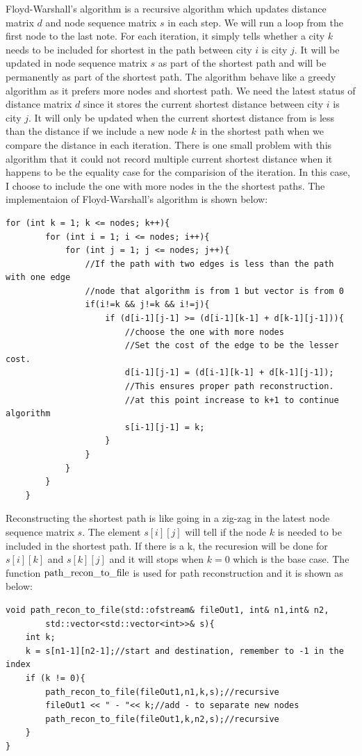 \documentclass[a4paper,12pt]{article}%
\begin{document}
Floyd-Warshall's algorithm is a recursive algorithm which updates distance matrix $d$ and 
node sequence matrix $s$ in each step. We will run a loop from the first node to the last note. For each iteration, it simply tells whether a city $k$ needs to be included for shortest in the path between city $i$ is city $j$. It will be updated in node sequence matrix $s$ as part of the shortest path and will be permanently as part of the shortest path. The algorithm behave like a greedy algorithm as it prefers more nodes and shortest path. We need the latest status of distance matrix $d$ since it stores the current shortest distance between city $i$ is city $j$. It will only be updated when the current shortest distance from is less than the distance if we include a new node $k$ in the shortest path when we compare the distance in each iteration. There is one small problem with this algorithm that it could not record multiple current shortest distance when it happens to be the equality case for the comparision of the iteration. In this case, I choose to include the one with more nodes in the the shortest paths. The implementaion of Floyd-Warshall’s algorithm is shown below:
\begin{lstlisting}[title = $\lstinline{WFI}$]
	for (int k = 1; k <= nodes; k++){
        for (int i = 1; i <= nodes; i++){
            for (int j = 1; j <= nodes; j++){
                //If the path with two edges is less than the path with one edge
                //node that algorithm is from 1 but vector is from 0
                if(i!=k && j!=k && i!=j){ 
                    if (d[i-1][j-1] >= (d[i-1][k-1] + d[k-1][j-1])){
                        //choose the one with more nodes
                        //Set the cost of the edge to be the lesser cost.
                        d[i-1][j-1] = (d[i-1][k-1] + d[k-1][j-1]);
                        //This ensures proper path reconstruction. 
                        //at this point increase to k+1 to continue algorithm
                        s[i-1][j-1] = k;
                    }
                }
            }  	  
		}
    }        
\end{lstlisting}
Reconstructing the shortest path is like going in a zig-zag in the latest node sequence matrix $s$. The element $s[i][j]$ will tell if the node $k$ is needed to be included in the shortest path. If there is a k, the recuresion will be done for $s[i][k]$ and $s[k][j]$ and it will stops when $k=0$ which is the base case. The function $\lstinline{path_recon_to_file}$ is used for path reconstruction and it is shown as below:
\begin{lstlisting}[title = $\lstinline{path_recon_to_file}$]
void path_recon_to_file(std::ofstream& fileOut1, int& n1,int& n2, 
        std::vector<std::vector<int>>& s){
    int k;
    k = s[n1-1][n2-1];//start and destination, remember to -1 in the index
    if (k != 0){
        path_recon_to_file(fileOut1,n1,k,s);//recursive
        fileOut1 << " - "<< k;//add - to separate new nodes
        path_recon_to_file(fileOut1,k,n2,s);//recursive
    }
} 
\end{lstlisting}
\end{document}

